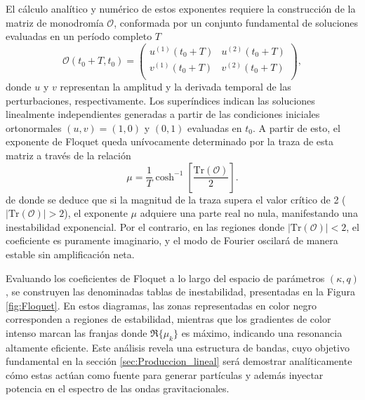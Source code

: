 El cálculo analítico y numérico de estos exponentes requiere la construcción de la matriz de monodromía $\mathcal{O}$, conformada por un conjunto fundamental de soluciones evaluadas en un período completo $T$ \cite{Amin_2014, Kofman_1997}
\begin{equation}
    \mathcal{O} \left( t_0 + T, t_0 \right) = \begin{pmatrix}
        u^{(1)} (t_0 + T) & u^{(2)} (t_0 + T)\\
        v^{(1)} (t_0 + T) & v^{(2)} (t_0 + T)\\
    \end{pmatrix},
\end{equation}
donde $u$ y $v$ representan la amplitud y la derivada temporal de las perturbaciones, respectivamente. Los superíndices indican las soluciones linealmente independientes generadas a partir de las condiciones iniciales ortonormales $(u, v) = (1,0)$ y $(0,1)$ evaluadas en $t_0$. A partir de esto, el exponente de Floquet queda unívocamente determinado por la traza de esta matriz a través de la relación
\begin{equation}
    \mu = \frac{1}{T} \cosh^{-1} \left[ \frac{\text{Tr} \left( \mathcal{O} \right)}{2} \right].
\end{equation}
de donde se deduce que si la magnitud de la traza supera el valor crítico de 2 ($|\text{Tr}(\mathcal{O})| > 2$), el exponente $\mu$ adquiere una parte real no nula, manifestando una inestabilidad exponencial. Por el contrario, en las regiones donde $|\text{Tr}(\mathcal{O})| < 2$, el coeficiente es puramente imaginario, y el modo de Fourier oscilará de manera estable sin amplificación neta. 

Evaluando los coeficientes de Floquet a lo largo del espacio de parámetros $(\kappa, q)$, se construyen las denominadas tablas de inestabilidad, presentadas en la Figura \ref{fig:Floquet}. En estos diagramas, las zonas representadas en color negro corresponden a regiones de estabilidad, mientras que los gradientes de color intenso marcan las franjas donde $\Re\{\mu_k\}$ es máximo, indicando una resonancia altamente eficiente. Este análisis revela una estructura de bandas, cuyo objetivo fundamental en la sección \ref{sec:Produccion_lineal} será demostrar analíticamente cómo estas actúan como fuente para generar partículas y además inyectar potencia en el espectro de las ondas gravitacionales.

